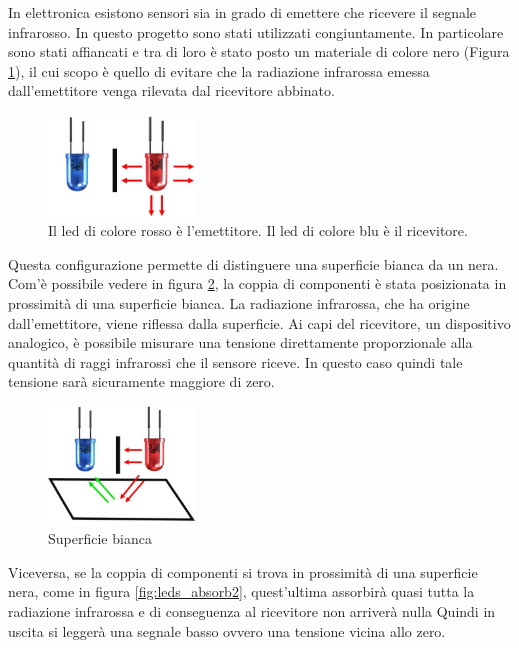 \documentclass[twoside,twocolumn]{article}
\begin{document}
In elettronica esistono sensori sia in grado di emettere che ricevere il segnale infrarosso. In questo progetto sono stati utilizzati congiuntamente. In particolare sono stati affiancati e tra di loro è stato posto un materiale di colore nero (Figura \ref{fig:coppia}), il cui scopo è quello di evitare che la radiazione infrarossa emessa dall'emettitore venga rilevata dal ricevitore abbinato.

\begin{figure}[h]
	\centering
	\includegraphics[width=0.35\textwidth]{immagini/coppia}
	\caption{Il led di colore rosso è l'emettitore. Il led di colore blu è il ricevitore.}
	\label{fig:coppia}
\end{figure}

Questa configurazione permette di distinguere una superficie bianca da un nera. Com'è possibile vedere in figura \ref{fig:leds_absorb1}, la coppia di componenti è stata posizionata in prossimità di una superficie bianca. La radiazione infrarossa, che ha origine dall'emettitore, viene riflessa dalla superficie. Ai capi del ricevitore, un dispositivo analogico, è possibile misurare una tensione direttamente proporzionale alla quantità di raggi infrarossi che il sensore riceve. In questo caso quindi tale tensione sarà sicuramente maggiore di zero.

\begin{figure}[h]
	\centering
	\includegraphics[width=0.35\textwidth]{immagini/leds_absorb1}
	\caption{Superficie bianca}
	\label{fig:leds_absorb1}
\end{figure}

\newpage
Viceversa, se la coppia di componenti si trova in prossimità di una superficie nera, come in figura  \ref{fig:leds_absorb2}, quest'ultima assorbirà quasi tutta la radiazione infrarossa e di conseguenza al ricevitore non arriverà nulla Quindi in uscita si leggerà una segnale basso ovvero una tensione vicina allo zero.
\end{document}

